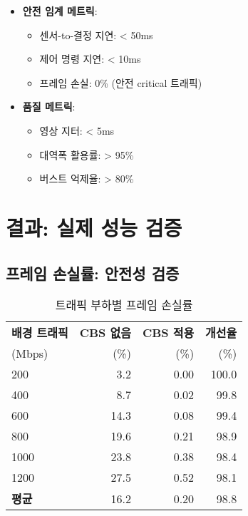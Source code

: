 \documentclass[twocolumn,10pt]{article}
\begin{document}
\begin{itemize}
    \item \textbf{안전 임계 메트릭}:
        \begin{itemize}
            \item 센서-to-결정 지연: < 50ms
            \item 제어 명령 지연: < 10ms
            \item 프레임 손실: 0\% (안전 critical 트래픽)
        \end{itemize}
    \item \textbf{품질 메트릭}:
        \begin{itemize}
            \item 영상 지터: < 5ms
            \item 대역폭 활용률: > 95\%
            \item 버스트 억제율: > 80\%
        \end{itemize}
\end{itemize}

\section{결과: 실제 성능 검증}
\label{sec:results}

\subsection{프레임 손실률: 안전성 검증}

\begin{table}[h]
\centering
\caption{트래픽 부하별 프레임 손실률}
\label{tab:frame_loss}
\begin{tabular}{lrrr}
\toprule
\textbf{배경 트래픽} & \textbf{CBS 없음} & \textbf{CBS 적용} & \textbf{개선율} \\
(Mbps) & (\%) & (\%) & (\%) \\
\midrule
200 & 3.2 & 0.00 & 100.0 \\
400 & 8.7 & 0.02 & 99.8 \\
600 & 14.3 & 0.08 & 99.4 \\
800 & 19.6 & 0.21 & 98.9 \\
1000 & 23.8 & 0.38 & 98.4 \\
1200 & 27.5 & 0.52 & 98.1 \\
\midrule
\textbf{평균} & 16.2 & 0.20 & 98.8 \\
\bottomrule
\end{tabular}
\end{table}
\end{document}
